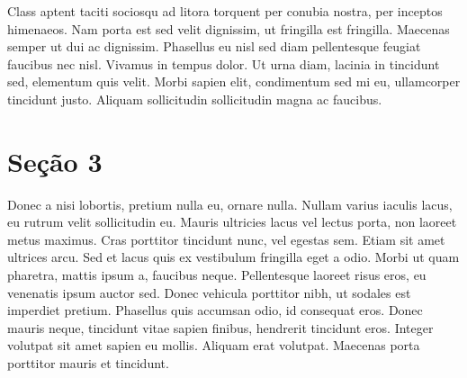 {Class aptent taciti sociosqu ad litora torquent per conubia nostra, per inceptos himenaeos. Nam porta est sed velit dignissim, ut fringilla est fringilla. Maecenas semper ut dui ac dignissim. Phasellus eu nisl sed diam pellentesque feugiat faucibus nec nisl. Vivamus in tempus dolor. Ut urna diam, lacinia in tincidunt sed, elementum quis velit. Morbi sapien elit, condimentum sed mi eu, ullamcorper tincidunt justo. Aliquam sollicitudin sollicitudin magna ac faucibus.


\section{Seção 3}\label{Seção 32}
Donec a nisi lobortis, pretium nulla eu, ornare nulla. Nullam varius iaculis lacus, eu rutrum velit sollicitudin eu. Mauris ultricies lacus vel lectus porta, non laoreet metus maximus. Cras porttitor tincidunt nunc, vel egestas sem. Etiam sit amet ultrices arcu. Sed et lacus quis ex vestibulum fringilla eget a odio. Morbi ut quam pharetra, mattis ipsum a, faucibus neque. Pellentesque laoreet risus eros, eu venenatis ipsum auctor sed. Donec vehicula porttitor nibh, ut sodales est imperdiet pretium. Phasellus quis accumsan odio, id consequat eros. Donec mauris neque, tincidunt vitae sapien finibus, hendrerit tincidunt eros. Integer volutpat sit amet sapien eu mollis. Aliquam erat volutpat. Maecenas porta porttitor mauris et tincidunt.

}
